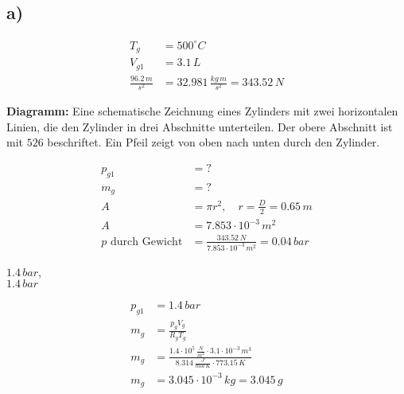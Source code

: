 

\subsection*{a)}

\begin{align*}
T_g &= 500^\circ C \\
V_{g1} &= 3.1\,L \\
\frac{96.2\,m}{s^2} &= 32.981\,\frac{kg\,m}{s^2} = 343.52\,N
\end{align*}

\textbf{Diagramm:} Eine schematische Zeichnung eines Zylinders mit zwei horizontalen Linien, die den Zylinder in drei Abschnitte unterteilen. Der obere Abschnitt ist mit $526$ beschriftet. Ein Pfeil zeigt von oben nach unten durch den Zylinder.

\begin{align*}
p_{g1} &= ? \\
m_g &= ? \\
A &= \pi r^2, \quad r = \frac{D}{2} = 0.65\,m \\
A &= 7.853 \cdot 10^{-3}\,m^2 \\
p \text{ durch Gewicht} &= \frac{343.52\,N}{7.853 \cdot 10^{-3}\,m^2} = 0.04\,bar
\end{align*}

 $1.4\,bar$, \\
 $1.4\,bar$ 

\begin{align*}
p_{g1} &= 1.4\,bar \\
m_g &= \frac{p_g V_g}{R_g T_g} \\
m_g &= \frac{1.4 \cdot 10^5\,\frac{N}{m^2} \cdot 3.1 \cdot 10^{-3}\,m^3}{8.314\,\frac{J}{mol\,K} \cdot 773.15\,K} \\
m_g &= 3.045 \cdot 10^{-3}\,kg = 3.045\,g
\end{align*}
